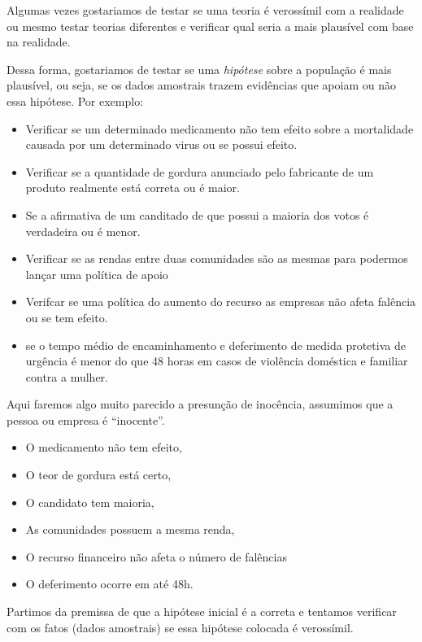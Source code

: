 \documentclass[
  letterpaper,
  DIV=11,
  numbers=noendperiod]{scrreprt}
\providecommand{\tightlist}{%
  \setlength{\itemsep}{0pt}\setlength{\parskip}{0pt}}
\begin{document}
Algumas vezes gostariamos de testar se uma teoria é verossímil com a
realidade ou mesmo testar teorias diferentes e verificar qual seria a
mais plausível com base na realidade.

Dessa forma, gostariamos de testar se uma \textit{hipótese} sobre a
população é mais plausível, ou seja, se os dados amostrais trazem
evidências que apoiam ou não essa hipótese. Por exemplo:

\begin{itemize}
\tightlist
\item
  Verificar se um determinado medicamento não tem efeito sobre a
  mortalidade causada por um determinado virus ou se possui efeito.
\item
  Verificar se a quantidade de gordura anunciado pelo fabricante de um
  produto realmente está correta ou é maior.
\item
  Se a afirmativa de um canditado de que possui a maioria dos votos é
  verdadeira ou é menor.
\item
  Verificar se as rendas entre duas comunidades são as mesmas para
  podermos lançar uma política de apoio
\item
  Verifcar se uma política do aumento do recurso as empresas não afeta
  falência ou se tem efeito.
\item
  se o tempo médio de encaminhamento e deferimento de medida protetiva
  de urgência é menor do que 48 horas em casos de violência doméstica e
  familiar contra a mulher.
\end{itemize}

Aqui faremos algo muito parecido a presunção de inocência, assumimos que
a pessoa ou empresa é ``inocente''.

\begin{itemize}
\tightlist
\item
  O medicamento não tem efeito,
\item
  O teor de gordura está certo,
\item
  O candidato tem maioria,
\item
  As comunidades possuem a mesma renda,
\item
  O recurso financeiro não afeta o número de falências
\item
  O deferimento ocorre em até 48h.
\end{itemize}

\begin{tcolorbox}[enhanced jigsaw, titlerule=0mm, colback=white, coltitle=black, opacityback=0, breakable, colbacktitle=quarto-callout-note-color!10!white, toprule=.15mm, colframe=quarto-callout-note-color-frame, toptitle=1mm, bottomtitle=1mm, opacitybacktitle=0.6, left=2mm, arc=.35mm, rightrule=.15mm, bottomrule=.15mm, leftrule=.75mm, title=\textcolor{quarto-callout-note-color}{\faInfo}\hspace{0.5em}{A Intuição}]

Partimos da premissa de que a hipótese inicial é a correta e tentamos
verificar com os fatos (dados amostrais) se essa hipótese colocada é
verossímil.

\end{tcolorbox}
\end{document}
